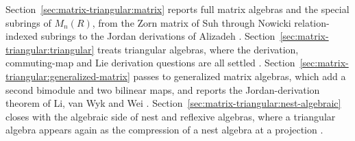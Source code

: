 Section~\ref{sec:matrix-triangular:matrix} reports full matrix algebras and
the special subrings of $M_n(R)$, from the Zorn matrix of Suh through Nowicki
relation-indexed subrings to the Jordan derivations of Alizadeh
\cite[Theorem~3.1, p.~575]{Alizadeh2009}.
Section~\ref{sec:matrix-triangular:triangular} treats triangular algebras,
where the derivation, commuting-map and Lie derivation questions are all
settled \cite[Theorem~11, p.~307]{Cheung2003}.
Section~\ref{sec:matrix-triangular:generalized-matrix} passes to generalized
matrix algebras, which add a second bimodule and two bilinear maps, and
reports the Jordan-derivation theorem of Li, van Wyk and Wei
\cite[Theorem~3.11, p.~13]{LiVanWykWei2012}.
Section~\ref{sec:matrix-triangular:nest-algebraic} closes with the algebraic
side of nest and reflexive algebras, where a triangular algebra appears again
as the compression of a nest algebra at a projection \cite[Proposition~19,
p.~308]{Cheung2003}.

